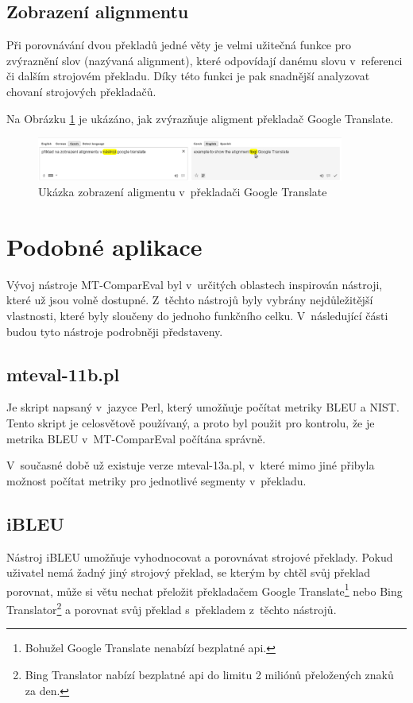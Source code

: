 \subsection{Zobrazení alignmentu}
Při porovnávání dvou překladů jedné věty je velmi užitečná funkce pro zvýraznění slov (nazývaná alignment),
  které odpovídají danému slovu v~referenci či dalším strojovém překladu.
Díky této funkci je pak snadnější analyzovat chovaní strojových překladačů.

Na Obrázku \ref{img:alignment} je ukázáno, jak zvýrazňuje aligment překladač Google Translate.
\begin{figure}
	\center
	\includegraphics[width=0.9\textwidth]{img/alignment.eps}
	\caption{Ukázka zobrazení aligmentu v~překladači Google Translate}
	\label{img:alignment}
\end{figure}

\section{Podobné aplikace}
Vývoj nástroje MT-ComparEval byl v~určitých oblastech inspirován nástroji,
  které už jsou volně dostupné.
Z~těchto nástrojů byly vybrány nejdůležitější vlastnosti,
  které byly sloučeny do jednoho funkčního celku.
V~následující části budou tyto nástroje podrobněji představeny.

\subsection{mteval-11b.pl}
Je skript napsaný v~jazyce Perl,
  který umožňuje počítat metriky BLEU a NIST.
Tento skript je celosvětově používaný,
  a proto byl použit pro kontrolu,
  že je metrika BLEU v~MT-ComparEval počítána správně.

V~současné době už existuje verze mteval-13a.pl,
  v~které mimo jiné přibyla možnost počítat metriky pro jednotlivé segmenty v~překladu.

\subsection{iBLEU}
Nástroj iBLEU umožňuje vyhodnocovat a porovnávat strojové překlady.
Pokud uživatel nemá žadný jiný strojový překlad,
  se kterým by chtěl svůj překlad porovnat,
  může si větu nechat přeložit překladačem Google Translate\footnote{
    Bohužel Google Translate nenabízí bezplatné api.
  } nebo Bing Translator\footnote{
    Bing Translator nabízí bezplatné api do limitu 2 miliónů přeložených znaků za den.
  }
  a porovnat svůj překlad s~překladem z~těchto nástrojů.

